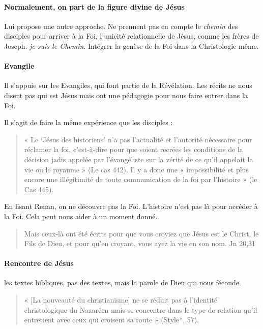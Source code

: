 \paragraph{Normalement, on part de la figure divine de Jésus} Lui propose une autre approche. Ne prennent pas en compte le \textit{chemin } des disciples pour arriver à la Foi, l'unicité relationnelle de Jésus, comme les frères de Joseph. \textit{je suis le Chemin}. Intégrer la genèse de la Foi dans la Christologie même. 
\paragraph{Evangile}
Il s'appuie sur les Evangiles, qui font partie de la Révélation.
Les récits ne nous disent pas qui est Jésus mais ont une pédagogie pour nous faire entrer dans la Foi. 

Il s'agit de faire la même expérience que les disciples :
    
\begin{quote}
    « Le ‘Jésus des historiens’ n’a pas l’actualité et l’autorité nécessaire pour réclamer la foi, c’est-à-dire pour que soient recrées les conditions de la décision jadis appelée par l’évangéliste sur la vérité de ce qu’il appelait la vie ou le royaume » (Le cas 442). Il y a donc une « impossibilité et plus encore une illégitimité de toute communication de la foi par l’histoire » (le Cas 445).
\end{quote}

En lisant Renan, on ne découvre pas la Foi. L'histoire n'est pas là pour accéder à la Foi. Cela peut nous aider à un moment donné. 
\begin{quote}
     Mais ceux-là ont été écrits pour que vous croyiez que Jésus est le Christ, le Fils de Dieu, et pour qu’en croyant, vous ayez la vie en son nom.
    Jn 20,31
\end{quote}


\paragraph{Rencontre de Jésus}
les textes bibliques, pas des textes, mais la parole de Dieu qui nous féconde.
\begin{quote}
    « [La nouveauté du christianisme] ne se réduit pas à l’identité christologique du Nazaréen mais se concentre dans le type de relation qu’il entretient avec ceux qui croisent sa route » (Style*, 57). 
\end{quote}

